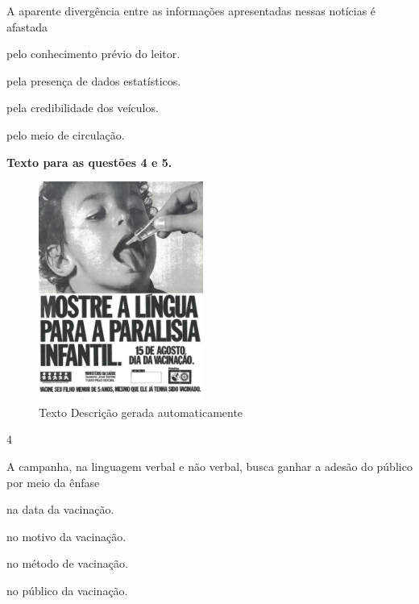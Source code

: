 A aparente divergência entre as informações apresentadas nessas notícias
é afastada

\begin{escolha}
\item pelo conhecimento prévio do leitor.

\item pela presença de dados estatísticos.

\item pela credibilidade dos veículos.

\item pelo meio de circulação.
\end{escolha}

\textbf{Texto para as questões 4 e 5.}

\begin{figure}
\centering
\includegraphics[width=2.12879in,height=2.83333in]{./imgSAEB_8_POR/media/image39.jpeg}
\caption{Texto Descrição gerada automaticamente}
\end{figure}


\num{4}

A campanha, na linguagem verbal e não verbal, busca ganhar a adesão do
público por meio da ênfase

\begin{escolha}
\item na data da vacinação.

\item no motivo da vacinação.

\item no método de vacinação.

\item no público da vacinação.
\end{escolha}


